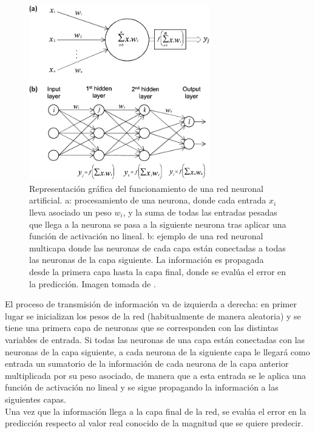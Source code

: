 \begin{figure}[h]
\centering
\includegraphics[width=0.70\textwidth]{figures/a-The-building-block-of-deep-neural-networks-artificial-neuron-or-node-Each-input-x.png}
\caption{Representaci\'on gr\'afica del funcionamiento de una red neuronal artificial. a: procesamiento de una neurona, donde cada entrada $x_{i}$ lleva asociado un peso $w_{i}$, y la suma de todas las entradas pesadas que llega a la neurona se pasa a la siguiente neurona tras aplicar una funci\'on de activaci\'on no lineal. b: ejemplo de una red neuronal multicapa donde las neuronas de cada capa est\'an conectadas a todas las neuronas de la capa siguiente. La informaci\'on es propagada desde la primera capa hasta la capa final, donde se eval\'ua el error en la predicci\'on. Imagen tomada de \cite{Vieira2017}.}
\label{fig:ann}
\end{figure}

El proceso de transmisi\'on de informaci\'on va de izquierda a derecha: en primer lugar se inicializan los pesos de la red (habitualmente de manera aleatoria) y se tiene una primera capa de neuronas que se corresponden con las distintas variables de entrada. Si todas las neuronas de una capa est\'an conectadas con las neuronas de la capa siguiente, a cada neurona de la siguiente capa le llegar\'a como entrada un sumatorio de la informaci\'on de cada neurona de la capa anterior multiplicada por su peso asociado, de manera que a esta entrada se le aplica una funci\'on de activaci\'on no lineal y se sigue propagando la informaci\'on a las siguientes capas. \\
Una vez que la informaci\'on llega a la capa final de la red, se eval\'ua el error en la predicci\'on respecto al valor real conocido de la magnitud que se quiere predecir. \\

